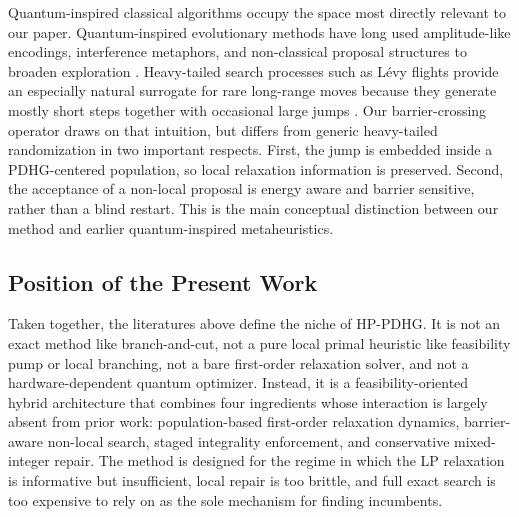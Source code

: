 Quantum-inspired classical algorithms occupy the space most directly relevant to our paper. Quantum-inspired evolutionary methods have long used amplitude-like encodings, interference metaphors, and non-classical proposal structures to broaden exploration \cite{das2005quantum,das2011quantum}. Heavy-tailed search processes such as L\'{e}vy flights provide an especially natural surrogate for rare long-range moves because they generate mostly short steps together with occasional large jumps \cite{viswanathan2008levy}. Our barrier-crossing operator draws on that intuition, but differs from generic heavy-tailed randomization in two important respects. First, the jump is embedded inside a PDHG-centered population, so local relaxation information is preserved. Second, the acceptance of a non-local proposal is energy aware and barrier sensitive, rather than a blind restart. This is the main conceptual distinction between our method and earlier quantum-inspired metaheuristics.

\subsection{Position of the Present Work}

Taken together, the literatures above define the niche of HP-PDHG. It is not an exact method like branch-and-cut, not a pure local primal heuristic like feasibility pump or local branching, not a bare first-order relaxation solver, and not a hardware-dependent quantum optimizer. Instead, it is a feasibility-oriented hybrid architecture that combines four ingredients whose interaction is largely absent from prior work: population-based first-order relaxation dynamics, barrier-aware non-local search, staged integrality enforcement, and conservative mixed-integer repair. The method is designed for the regime in which the LP relaxation is informative but insufficient, local repair is too brittle, and full exact search is too expensive to rely on as the sole mechanism for finding incumbents.
